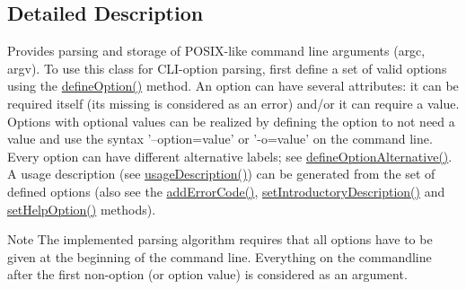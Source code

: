 \subsection{Detailed Description}
Provides parsing and storage of P\-O\-S\-I\-X-\/like command line arguments (argc, argv). To use this class for C\-L\-I-\/option parsing, first define a set of valid options using the \hyperlink{class_command_line_processing_1_1_argv_parser_a894849ef3ab1eebf40fad8434414393a}{define\-Option()} method. An option can have several attributes\-: it can be required itself (its missing is considered as an error) and/or it can require a value. Options with optional values can be realized by defining the option to not need a value and use the syntax '--option=value' or '-\/o=value' on the command line. Every option can have different alternative labels; see \hyperlink{class_command_line_processing_1_1_argv_parser_a23f0a81ee9ad8473f10ecec73bf0d714}{define\-Option\-Alternative()}. A usage description (see \hyperlink{class_command_line_processing_1_1_argv_parser_a3de10de9b05caa7b753545ce04891866}{usage\-Description()}) can be generated from the set of defined options (also see the \hyperlink{class_command_line_processing_1_1_argv_parser_a26ee6c4c955cace021993c2aa91c6be3}{add\-Error\-Code()}, \hyperlink{class_command_line_processing_1_1_argv_parser_a47ab1e3c4b8fabce2288d4d4ae5b6026}{set\-Introductory\-Description()} and \hyperlink{class_command_line_processing_1_1_argv_parser_a48527d8fd9a49d3ac00112f1eb31a0f9}{set\-Help\-Option()} methods). \begin{DoxyNote}{Note}
The implemented parsing algorithm requires that all options have to be given at the beginning of the command line. Everything on the commandline after the first non-\/option (or option value) is considered as an argument. 
\end{DoxyNote}
